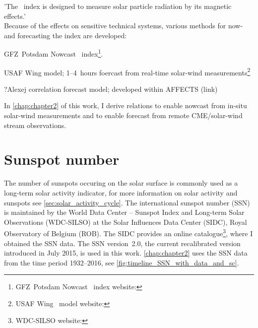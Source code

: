 'The \Kp{}~index is designed to measure solar particle radiation by its magnetic effects.'\\

Because of the effects on sensitive technical systems, various methods for now- and forecasting the \Kp{} index are developed:
\begin{itemize*}
	\item GFZ~Potsdam Nowcast \Kp~index\footnote{GFZ~Potsdam Nowcast \Kp~index website: }.
	\item USAF Wing \Kp{} model; 1--4~hours foercast from real-time solar-wind measurements\footnote{USAF Wing \Kp~model website: }
	\item ?Alexej \Kp{} correlation forecast model; developed within AFFECTS (link)
	\item In \autoref{chap:chapter2} of this work, I derive relations to enable \Kp{} nowcast from in-situ solar-wind measurements and to enable \Kp{} forecast from remote CME/solar-wind stream observations.
\end{itemize*}



\section{Sunspot number}
\label{sec:sunspot_number}
The number of sunspots occuring on the solar surface is commonly used as a long-term solar activity indicator, for more information on solar activity and sunspots see \autoref{sec:solar_activity_cycle}. The international sunspot number (SSN) is maintained by the World Data Center -- Sunspot Index and Long-term Solar Observations (WDC-SILSO) at the Solar Influences Data Center (SIDC), Royal Observatory of Belgium (ROB). The SIDC provides an online catalogue\footnote{WDC-SILSO website: }, where I obtained the SSN data. The SSN version~2.0, the current recalibrated version introduced in July 2015, is used in this work. \autoref{chap:chapter2} uses the SSN data from the time period 1932--2016, see \autoref{fig:timeline_SSN_with_data_and_sc}.

